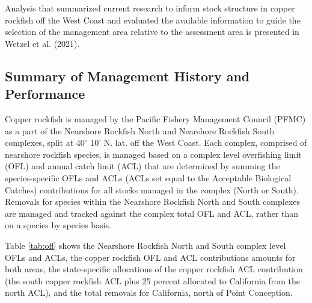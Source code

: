 \documentclass[11pt,
  english,
  a4paper,
]{article}
\begin{document}
Analysis that summarized current research to inform stock structure in copper rockfish off the West Coast and evaluated the available information to guide the selection of the management area relative to the assessment area is presented in Wetzel et al. {(2021)\leavevmode\tagmcend\tagstructend}.

\leavevmode\tagmcend\tagstructend\par


\hypertarget{summary-of-management-history-and-performance}{%
\subsection{Summary of Management History and Performance}\label{summary-of-management-history-and-performance}}

\leavevmode\tagmcend\tagstructend


Copper rockfish is managed by the Pacific Fishery Management Council (PFMC) as a part of the Nearshore Rockfish North and Nearshore Rockfish South complexes, split at 40{\(^\circ\)\leavevmode\tagmcend\tagstructend} 10' N. lat. off the West Coast. Each complex, comprised of nearshore rockfish species, is managed based on a complex level overfishing limit (OFL) and annual catch limit (ACL) that are determined by summing the species-specific OFLs and ACLs (ACLs set equal to the Acceptable Biological Catches) contributions for all stocks managed in the complex (North or South). Removals for species within the Nearshore Rockfish North and South complexes are managed and tracked against the complex total OFL and ACL, rather than on a species by species basis.

\leavevmode\tagmcend\tagstructend\par


Table \ref{tab:ofl} shows the Nearshore Rockfish North and South complex level OFLs and ACLs, the copper rockfish OFL and ACL contributions amounts for both areas, the state-specific allocations of the copper rockfish ACL contribution (the south copper rockfish ACL plus 25 percent allocated to California from the north ACL), and the total removals for California, north of Point Conception.
\end{document}
